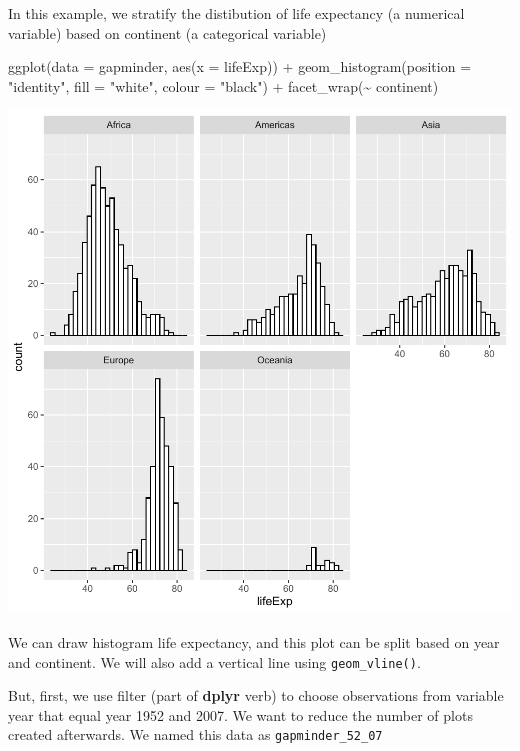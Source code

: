 \documentclass[
]{book}
\makeatletter
\newenvironment{Shaded}{\begin{snugshade}}{\end{snugshade}}
\newcommand{\AttributeTok}[1]{\textcolor[rgb]{0.61,0.61,0.61}{#1}}
\newcommand{\FunctionTok}[1]{\textcolor[rgb]{0,0,0}{#1}}
\newcommand{\NormalTok}[1]{#1}
\newcommand{\SpecialCharTok}[1]{\textcolor[rgb]{0,0,0}{#1}}
\newcommand{\StringTok}[1]{\textcolor[rgb]{0.5,0.5,0.5}{#1}}
\newenvironment{kframe}{%
\medskip{}
\setlength{\fboxsep}{.8em}
 \def\at@end@of@kframe{}%
 \ifinner\ifhmode%
  \def\at@end@of@kframe{\end{minipage}}%
  \begin{minipage}{\columnwidth}%
 \fi\fi%
 \def\FrameCommand##1{\hskip\@totalleftmargin \hskip-\fboxsep
 \colorbox{shadecolor}{##1}\hskip-\fboxsep
     \hskip-\linewidth \hskip-\@totalleftmargin \hskip\columnwidth}%
 \MakeFramed {\advance\hsize-\width
   \@totalleftmargin\z@ \linewidth\hsize
   \@setminipage}}%
 {\par\unskip\endMakeFramed%
 \at@end@of@kframe}
\renewenvironment{Shaded}{\begin{kframe}}{\end{kframe}}
\makeatother
\begin{document}
In this example, we stratify the distibution of life expectancy (a numerical variable) based on continent (a categorical variable)

\begin{Shaded}
\begin{Highlighting}[]
\FunctionTok{ggplot}\NormalTok{(}\AttributeTok{data =}\NormalTok{ gapminder, }\FunctionTok{aes}\NormalTok{(}\AttributeTok{x =}\NormalTok{ lifeExp)) }\SpecialCharTok{+}
         \FunctionTok{geom\_histogram}\NormalTok{(}\AttributeTok{position =} \StringTok{"identity"}\NormalTok{, }\AttributeTok{fill =} \StringTok{"white"}\NormalTok{, }\AttributeTok{colour =} \StringTok{"black"}\NormalTok{) }\SpecialCharTok{+}
         \FunctionTok{facet\_wrap}\NormalTok{(}\SpecialCharTok{\textasciitilde{}}\NormalTok{ continent)}
\end{Highlighting}
\end{Shaded}

\begin{center}\includegraphics[width=0.7\linewidth,keepaspectratio]{Multivariable_Data_Analysis_files/figure-latex/unnamed-chunk-82-1} \end{center}

We can draw histogram life expectancy, and this plot can be split based on year and continent. We will also add a vertical line using \texttt{geom\_vline()}.

But, first, we use filter (part of \textbf{dplyr} verb) to choose observations from variable year that equal year 1952 and 2007. We want to reduce the number of plots created afterwards. We named this data as \texttt{gapminder\_52\_07}
\end{document}
